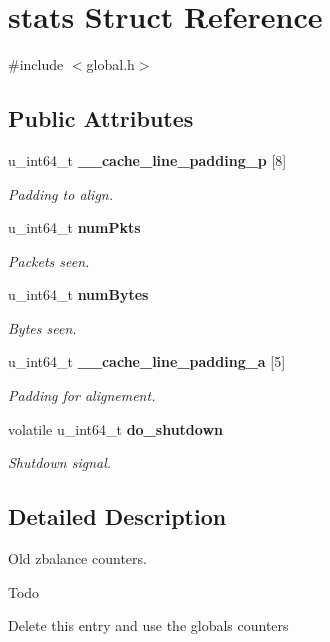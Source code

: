 \section{stats Struct Reference}
\label{structstats}


{\ttfamily \#include $<$global.\+h$>$}

\subsection*{Public Attributes}
\begin{DoxyCompactItemize}
\item 
u\+\_\+int64\+\_\+t {\bf \+\_\+\+\_\+cache\+\_\+line\+\_\+padding\+\_\+p} [8]
\begin{DoxyCompactList}\small\item\em Padding to align. \end{DoxyCompactList}\item 
u\+\_\+int64\+\_\+t {\bf num\+Pkts}
\begin{DoxyCompactList}\small\item\em Packets seen. \end{DoxyCompactList}\item 
u\+\_\+int64\+\_\+t {\bf num\+Bytes}
\begin{DoxyCompactList}\small\item\em Bytes seen. \end{DoxyCompactList}\item 
u\+\_\+int64\+\_\+t {\bf \+\_\+\+\_\+cache\+\_\+line\+\_\+padding\+\_\+a} [5]
\begin{DoxyCompactList}\small\item\em Padding for alignement. \end{DoxyCompactList}\item 
volatile u\+\_\+int64\+\_\+t {\bf do\+\_\+shutdown}
\begin{DoxyCompactList}\small\item\em Shutdown signal. \end{DoxyCompactList}\end{DoxyCompactItemize}


\subsection{Detailed Description}
Old zbalance counters. \begin{DoxyRefDesc}{Todo}
\item[{\bf Todo}]Delete this entry and use the globals counters \end{DoxyRefDesc}


